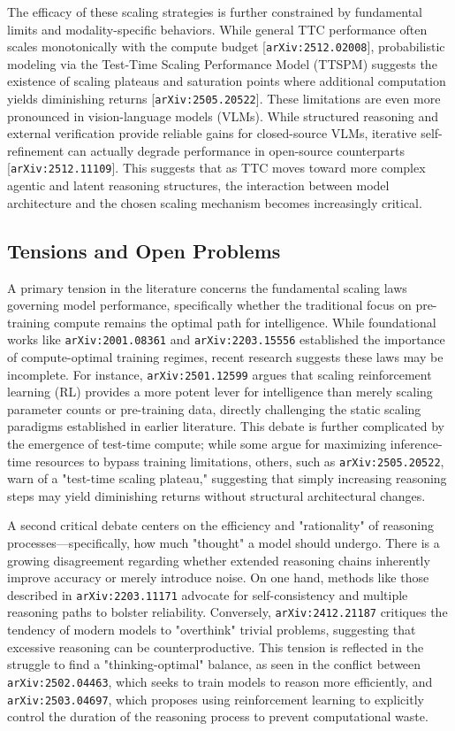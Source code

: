 \documentclass[11pt]{article}
\begin{document}
The efficacy of these scaling strategies is further constrained by fundamental limits and modality-specific behaviors. While general TTC performance often scales monotonically with the compute budget [\texttt{arXiv:2512.02008}], probabilistic modeling via the Test-Time Scaling Performance Model (TTSPM) suggests the existence of scaling plateaus and saturation points where additional computation yields diminishing returns [\texttt{arXiv:2505.20522}]. These limitations are even more pronounced in vision-language models (VLMs). While structured reasoning and external verification provide reliable gains for closed-source VLMs, iterative self-refinement can actually degrade performance in open-source counterparts [\texttt{arXiv:2512.11109}]. This suggests that as TTC moves toward more complex agentic and latent reasoning structures, the interaction between model architecture and the chosen scaling mechanism becomes increasingly critical.

\subsection{Tensions and Open Problems}

A primary tension in the literature concerns the fundamental scaling laws governing model performance, specifically whether the traditional focus on pre-training compute remains the optimal path for intelligence. While foundational works like \texttt{arXiv:2001.08361} and \texttt{arXiv:2203.15556} established the importance of compute-optimal training regimes, recent research suggests these laws may be incomplete. For instance, \texttt{arXiv:2501.12599} argues that scaling reinforcement learning (RL) provides a more potent lever for intelligence than merely scaling parameter counts or pre-training data, directly challenging the static scaling paradigms established in earlier literature. This debate is further complicated by the emergence of test-time compute; while some argue for maximizing inference-time resources to bypass training limitations, others, such as \texttt{arXiv:2505.20522}, warn of a "test-time scaling plateau," suggesting that simply increasing reasoning steps may yield diminishing returns without structural architectural changes.

A second critical debate centers on the efficiency and "rationality" of reasoning processes—specifically, how much "thought" a model should undergo. There is a growing disagreement regarding whether extended reasoning chains inherently improve accuracy or merely introduce noise. On one hand, methods like those described in \texttt{arXiv:2203.11171} advocate for self-consistency and multiple reasoning paths to bolster reliability. Conversely, \texttt{arXiv:2412.21187} critiques the tendency of modern models to "overthink" trivial problems, suggesting that excessive reasoning can be counterproductive. This tension is reflected in the struggle to find a "thinking-optimal" balance, as seen in the conflict between \texttt{arXiv:2502.04463}, which seeks to train models to reason more efficiently, and \texttt{arXiv:2503.04697}, which proposes using reinforcement learning to explicitly control the duration of the reasoning process to prevent computational waste.
\end{document}
